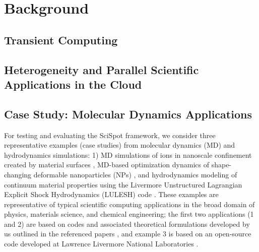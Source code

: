 
\section{Background}

\subsection{Transient Computing}

\subsection{Heterogeneity and Parallel Scientific Applications in the Cloud}


%
\subsection{Case Study: Molecular Dynamics Applications}

\begin{comment}
Describe the kind of computation.

Scaling properties. Almost perfectly scalable with O(n) communication? 

This can be a like a case study of parallel scientific simulations.
Will help relate to parameters etc with more concrete examples.

Bag of jobs.
Why multiple runs: parameter sweeps, search, or just multiple times to get confidence intervals and stable results in case of randomness. 
\end{comment}

For testing and evaluating the SciSpot framework, we consider three representative examples (case studies) from molecular dynamics (MD) and hydrodynamics simulations: 1) MD simulations of ions in nanoscale confinement created by material surfaces \cite{jjzo1,kadupitiya2017}, MD-based optimization dynamics of shape-changing deformable nanoparticles (NPs) \cite{jto1,jyto}, and hydrodynamics modeling of continuum material properties using the Livermore Unstructured Lagrangian Explicit Shock Hydrodynamics (LULESH) code \cite{IPDPS13:LULESH,LULESH2:changes}. These examples are representative of typical scientific computing applications in the broad domain of physics, materials science, and chemical engineering; the first two applications (1 and 2) are based on codes and associated theoretical formulations developed by us outlined in the referenced papers \cite{jso1,jso2,solis2013generating,jjzo1,jto1,jyto}, and example 3 is based on an open-source code developed at Lawrence Livermore National Laboratories \cite{IPDPS13:LULESH,LULESH:spec}. 

